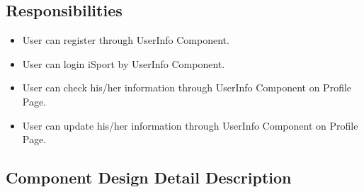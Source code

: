 \documentclass[16pt]{scrreprt}
\begin{document}
\subsection{Responsibilities}
\begin{itemize}
	\item User can register through UserInfo Component.
	\item User can login iSport by UserInfo Component. 
	\item User can check his/her information through UserInfo Component on Profile Page. 
	\item User can update his/her information through UserInfo Component on Profile Page. 
\end{itemize}

\subsection{Component Design Detail Description}
\end{document}
